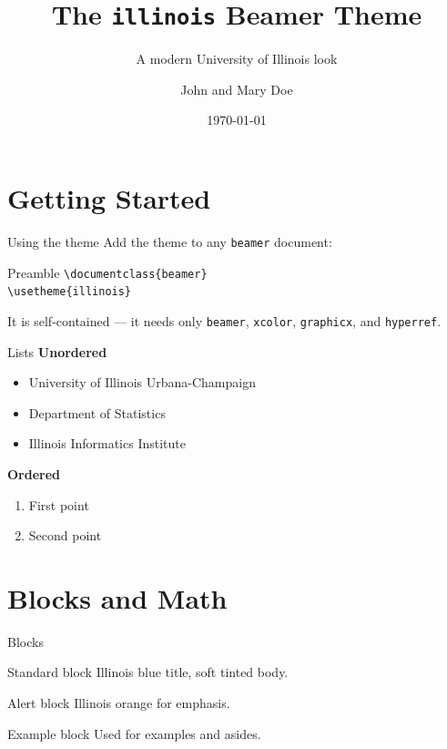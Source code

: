 \documentclass[aspectratio=169]{beamer}
\title{The \texttt{illinois} Beamer Theme}
\subtitle{A modern University of Illinois look}
\author{John and Mary Doe}
\institute[UIUC]{University of Illinois Urbana-Champaign}
\date{\today}
\begin{document}
\frame{\titlepage}

\section{Getting Started}

\begin{frame}{Using the theme}
  Add the theme to any \texttt{beamer} document:
  \begin{block}{Preamble}
    \texttt{\textbackslash documentclass\{beamer\}}\\
    \texttt{\textbackslash usetheme\{illinois\}}
  \end{block}
  It is self-contained --- it needs only \texttt{beamer}, \texttt{xcolor},
  \texttt{graphicx}, and \texttt{hyperref}.
\end{frame}

\begin{frame}{Lists}
  \textbf{Unordered}
  \begin{itemize}
    \item University of Illinois Urbana-Champaign
    \item Department of Statistics
    \item Illinois Informatics Institute
  \end{itemize}

  \textbf{Ordered}
  \begin{enumerate}
    \item First point
    \item Second point
  \end{enumerate}
\end{frame}

\section{Blocks and Math}

\begin{frame}{Blocks}
  \begin{block}{Standard block}
    Illinois blue title, soft tinted body.
  \end{block}
  \begin{alertblock}{Alert block}
    Illinois orange for emphasis.
  \end{alertblock}
  \begin{exampleblock}{Example block}
    Used for examples and asides.
  \end{exampleblock}
\end{frame}
\end{document}
